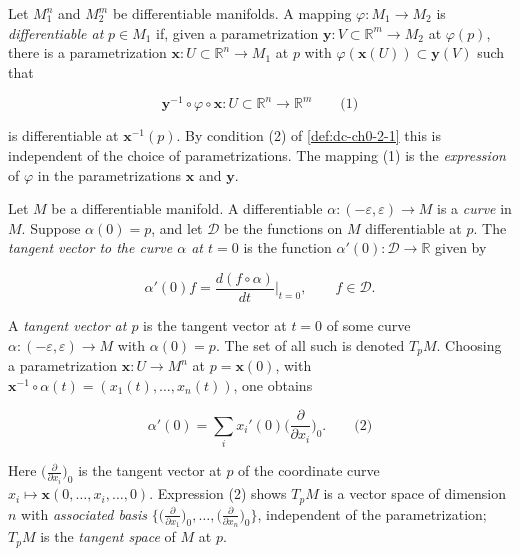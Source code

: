 \begin{definition}
  \label{def:dc-ch0-2-5}
  \leanok
  Let $M_1^n$ and $M_2^m$ be differentiable manifolds. A mapping
  $\varphi:M_1\to M_2$ is \emph{differentiable at} $p\in M_1$ if, given a parametrization
  $\mathbf{y}:V\subset\mathbb{R}^m\to M_2$ at $\varphi(p)$, there is a
  parametrization $\mathbf{x}:U\subset\mathbb{R}^n\to M_1$ at $p$ with
  $\varphi(\mathbf{x}(U))\subset\mathbf{y}(V)$ such that
  
  $$
  \mathbf{y}^{-1}\circ\varphi\circ\mathbf{x}:U\subset\mathbb{R}^n\to\mathbb{R}^m\qquad\text{(1)}
  $$
  
  is differentiable at $\mathbf{x}^{-1}(p)$. By condition (2) of \cref{def:dc-ch0-2-1}
  this is independent of the choice of parametrizations. The mapping (1) is the
  \emph{expression} of $\varphi$ in the parametrizations $\mathbf{x}$ and $\mathbf{y}$.
\end{definition}

\begin{definition}
  \label{def:dc-ch0-2-6}
  \leanok
  Let $M$ be a differentiable manifold. A differentiable
  $\alpha:(-\varepsilon,\varepsilon)\to M$ is a \emph{curve} in $M$. Suppose
  $\alpha(0)=p$, and let $\mathcal{D}$ be the functions on $M$ differentiable at
  $p$. The \emph{tangent vector to the curve $\alpha$ at $t=0$} is the function
  $\alpha'(0):\mathcal{D}\to\mathbb{R}$ given by
  
  $$
  \alpha'(0)f=\frac{d(f\circ\alpha)}{dt}\Big|_{t=0},\qquad f\in\mathcal{D}.
  $$
  
  A \emph{tangent vector at $p$} is the tangent vector at $t=0$ of some curve
  $\alpha:(-\varepsilon,\varepsilon)\to M$ with $\alpha(0)=p$. The set of all such
  is denoted $T_pM$. Choosing a parametrization $\mathbf{x}:U\to M^n$ at
  $p=\mathbf{x}(0)$, with $\mathbf{x}^{-1}\circ\alpha(t)=(x_1(t),\dots,x_n(t))$,
  one obtains
  
  $$
  \alpha'(0)=\sum_i x_i'(0)\Big(\frac{\partial}{\partial x_i}\Big)_0.\qquad\text{(2)}
  $$
  
  Here $\big(\frac{\partial}{\partial x_i}\big)_0$ is the tangent vector at $p$ of
  the coordinate curve $x_i\mapsto\mathbf{x}(0,\dots,x_i,\dots,0)$. Expression (2)
  shows $T_pM$ is a vector space of dimension $n$ with \emph{associated basis}
  $\big\{\big(\frac{\partial}{\partial x_1}\big)_0,\dots,\big(\frac{\partial}{\partial x_n}\big)_0\big\}$,
  independent of the parametrization; $T_pM$ is the \emph{tangent space} of $M$ at $p$.
\end{definition}

